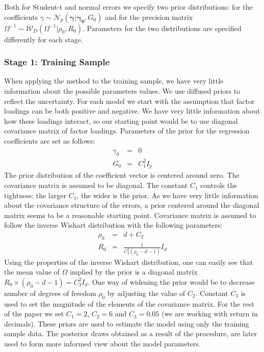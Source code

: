 Both for Student-t and normal errors we specify two prior distributions: for the coefficients $\gamma \sim \mathcal{N}_{p}\left( \boldsymbol{\gamma} |\boldsymbol{\gamma_{0}},G_{0}\right)$ and for the precision matrix $\Omega^{-1} \sim \mathcal{W}_{D}  \left(\Omega ^{-1}|\rho_{0}, R_{0}\right) $. 
Parameters for the two distributions are specified differently for each stage.


\subsubsection{Stage 1: Training Sample}
When applying the method to the training sample, we have very little information about the possible parameters values. 
We use diffused priors to reflect the uncertainty.
For each model we start with the assumption that factor loadings can be both positive and negative. 
We have very little information about how these loadings interact, so our starting point would be to use diagonal covariance matrix of factor loadings.
Parameters of the prior for the regression coefficients are set as follows:
\begin{eqnarray*}
	\gamma_{0} &=& 0 \\ 
	G_{0} &=& C_{1}^{2}I_{p} 
\end{eqnarray*}
The prior distribution of the coefficient vector is centered around zero. 
The covariance matrix is assumed to be diagonal.
The constant $C_{1}$ controls the tightness: the larger $C_{1}$, the wider is the prior.
As we have very little information about the covariance structure of the errors, a prior centered around the diagonal matrix seems to be a reasonable starting point. 
Covariance matrix is assumed to follow the inverse Wishart distribution with the following parameters:
\begin{eqnarray*}
	\rho_{0} &=& d + C_{2} \\ 
	R_{0} &=& \frac{1}{C_{3}^{2} (\rho_{0}-d-1)}I_{d}
\end{eqnarray*}
Using the properties of the inverse Wishart distribution, one can easily see that the mean value of $\Omega$ implied by the prior is a diagonal matrix $R_{0} \times(\rho_{0} - d- 1) = C_{3}^{2}I_{d}$. 
One way of widening the prior would be to decrease number of degrees of freedom $\rho_{0}$ by adjusting the value of $C_2$. 
Constant $C_{3}$ is used to set the magnitude of the elements of the covariance matrix. 
For the rest of the paper we set $C_{1} = 2$, $C_{2} = 6$ and $C_{3} = 0.05$ (we are working with return in decimals).
These priors are used to estimate the model using only the training sample data. 
The posterior draws obtained as a result of the procedure, are later used to form more informed view about the model parameters.

